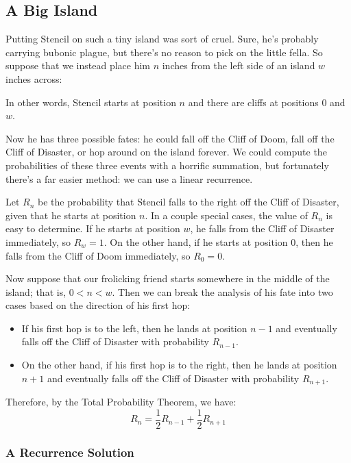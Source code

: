 \subsection{A Big Island}

Putting Stencil on such a tiny island was sort of cruel.  Sure, he's
probably carrying bubonic plague, but there's no reason to pick on the
little fella.  So suppose that we instead place him $n$ inches from
the left side of an island $w$ inches across:
%
\begin{figure}[h]
\end{figure}
%
In other words, Stencil starts at position $n$ and there are cliffs at
positions 0 and $w$.

Now he has three possible fates: he could fall off the Cliff of Doom,
fall off the Cliff of Disaster, or hop around on the island forever.
We could compute the probabilities of these three events with a
horrific summation, but fortunately there's a far easier method: we
can use a linear recurrence.

Let $R_n$ be the probability that Stencil falls to the right off the
Cliff of Disaster, given that he starts at position $n$.  In a couple
special cases, the value of $R_n$ is easy to determine.  If he starts
at position $w$, he falls from the Cliff of Disaster immediately, so
$R_w = 1$.  On the other hand, if he starts at position $0$, then he
falls from the Cliff of Doom immediately, so $R_0 = 0$.

Now suppose that our frolicking friend starts somewhere in the middle
of the island; that is, $0 < n < w$.  Then we can break the analysis
of his fate into two cases based on the direction of his first hop:
%
\begin{itemize}

\item If his first hop is to the left, then he lands at position $n-1$
and eventually falls off the Cliff of Disaster with probability
$R_{n-1}$.

\item On the other hand, if his first hop is to the right, then he
lands at position $n+1$ and eventually falls off the Cliff of Disaster
with probability $R_{n+1}$.

\end{itemize}
%
Therefore, by the Total Probability Theorem, we have:
%
\[
R_n = \frac{1}{2} R_{n-1} + \frac{1}{2} R_{n+1}
\]

\subsubsection*{A Recurrence Solution}

